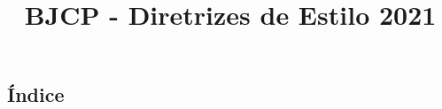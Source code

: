 \documentclass[a4paper, 9t]{article}
\title{BJCP - Diretrizes de Estilo 2021}
\renewcommand*\contentsname{}
\begin{document}
\raggedcolumns


\begin{multicols*}{2}
\section*{Índice}
\renewcommand\contentsname{}
\tableofcontents
\end{multicols*}








































\end{document}
